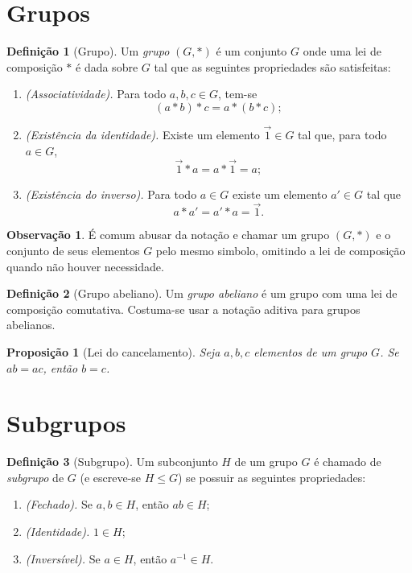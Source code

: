 \documentclass[a4paper,12pt]{report}
\theoremstyle{plain}
\newtheorem{proposicao}{Proposição}[section]
\theoremstyle{definition}
\newtheorem{definicao}{Definição}[section]
\newtheorem{observacao}{Observação}[section]
\begin{document}
\section{Grupos}

\begin{definicao}[Grupo]
	
	Um \emph{grupo} $(G,*)$ é um conjunto \(G\) onde uma lei de
	composição $*$ é dada sobre \(G\) tal que as seguintes propriedades são satisfeitas:
	
	\begin{enumerate}
		\item \emph{(Associatividade).} Para todo $a,b,c \in G$, tem-se $$(a*b)*c = a*(b*c);$$
		\item \emph{(Existência da identidade).} Existe um elemento $\vec{1}\in G$ tal que, para todo $a\in G$, $$\vec{1}*a = a*\vec{1} = a;$$
		\item \emph{(Existência do inverso).} Para todo $a\in G$ existe um elemento $a'\in G$ tal que $$a*a' = a'*a = \vec{1}.$$
	\end{enumerate}
\end{definicao}

\begin{observacao}
	É comum abusar da notação e chamar um grupo $(G,*)$ e o conjunto de	seus elementos $G$ pelo mesmo simbolo, omitindo a lei de composição quando não houver necessidade.	
\end{observacao}

\begin{definicao}[Grupo abeliano]
	Um \emph{grupo abeliano} é um grupo com uma lei de
	composição comutativa. Costuma-se usar a notação aditiva para grupos
	abelianos.
\end{definicao}

\begin{proposicao}[Lei do cancelamento]
	Seja \(a,b,c\) elementos de um grupo \(G\). Se \(ab = ac\), então \(b = c\).
\end{proposicao} 

\section{Subgrupos}

\begin{definicao}[Subgrupo]
	Um subconjunto \(H\) de um grupo \(G\) é chamado de \emph{subgrupo} de \(G\) (e escreve-se $H \leq G$) se possuir as seguintes propriedades:
	
	\begin{enumerate}
		\item \emph{(Fechado).} Se \(a,b\in H\), então \(ab\in H\);
		\item \emph{(Identidade).} \(1\in H\);
		\item \emph{(Inversível).} Se \(a\in H\), então \(a^{-1}\in H\).
	\end{enumerate}
	
\end{definicao}
\end{document}
